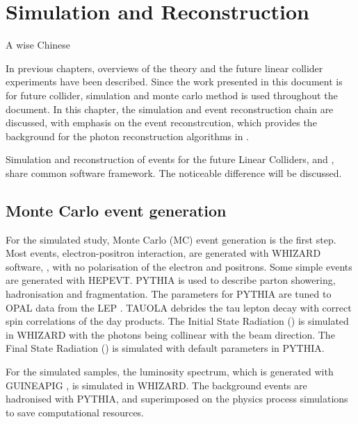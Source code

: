\chapter{Simulation and Reconstruction}
\label{chap:Reconstruction}

%
{A wise Chinese}%


In previous chapters, overviews of the theory and the future linear collider experiments have been described. Since the work presented in this document is for future collider, simulation and monte carlo method is used throughout the document. In this chapter, the simulation and event reconstruction chain are discussed, with emphasis on the \pandora event reconstrcution, which provides the background for the photon reconstruction algorithms in .

Simulation and reconstruction of events for the future Linear Colliders, \ILC and \CLIC, share common software framework. The noticeable difference will be discussed.

\section{Monte Carlo event generation}

For the simulated study, Monte Carlo (MC) event generation is the first step. Most events, electron-positron interaction, are generated with WHIZARD software, \cite{whizard,Moretti:2001zz}, with no polarisation of the electron and positrons. Some simple events are generated with HEPEVT. PYTHIA \cite{Sjostrand:1995iq} is used to describe parton showering, hadronisation and fragmentation. The parameters for PYTHIA are tuned to OPAL data from the LEP \cite{Alexander:1995bk}. TAUOLA \cite{Jadach:1993hs} debrides the tau lepton decay with correct spin correlations of the day products. The Initial State Radiation (\ISR) is simulated in WHIZARD with the \ISR photons being collinear with the beam direction. The Final State Radiation (\FSR) is simulated with default parameters in PYTHIA.

For the \CLIC simulated samples, the luminosity spectrum, which is generated with GUINEAPIG \cite{Schulte:1999tx}, is simulated in WHIZARD. The \ggHad background events are hadronised with PYTHIA, and superimposed on the physics process simulations to save computational resources.

